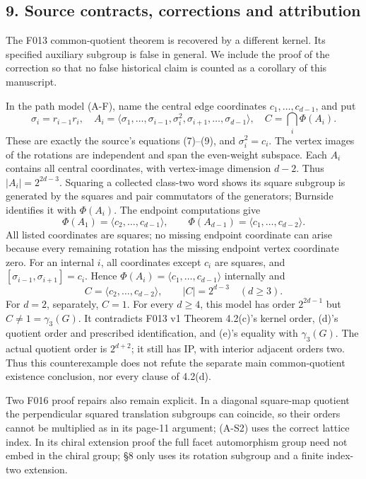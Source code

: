 \documentclass[
  11pt,
  a4paper,
]{article}
\begin{document}
\subsection{9. Source contracts, corrections and
attribution}\label{source-contracts-corrections-and-attribution}

The F013 common-quotient theorem is recovered by a different kernel. Its
specified auxiliary subgroup is false in general. We include the proof
of the correction so that no false historical claim is counted as a
corollary of this manuscript.

In the path model (A-F), name the central edge coordinates
\(c_1,\ldots,c_{d-1}\), and put \[
 \sigma_i=r_{i-1}r_i,\quad
 A_i=\langle\sigma_1,\ldots,\sigma_{i-1},\sigma_i^2,
                  \sigma_{i+1},\ldots,\sigma_{d-1}\rangle,
 \quad C=\bigcap_i\Phi(A_i).                              \tag{A-X1}
\] These are exactly the source's equations (7)--(9), and
\(\sigma_i^2=c_i\). The vertex images of the rotations are independent
and span the even-weight subspace. Each \(A_i\) contains all central
coordinates, with vertex-image dimension \(d-2\). Thus
\(|A_i|=2^{2d-3}\). Squaring a collected class-two word shows its square
subgroup is generated by the squares and pair commutators of the
generators; Burnside identifies it with \(\Phi(A_i)\). The endpoint
computations give \[
 \Phi(A_1)=\langle c_2,\ldots,c_{d-1}\rangle,\qquad
 \Phi(A_{d-1})=\langle c_1,\ldots,c_{d-2}\rangle.
\] All listed coordinates are squares; no missing endpoint coordinate
can arise because every remaining rotation has the missing endpoint
vertex coordinate zero. For an internal \(i\), all coordinates except
\(c_i\) are squares, and \([\sigma_{i-1},\sigma_{i+1}]=c_i\). Hence
\(\Phi(A_i)=\langle c_1,\ldots,c_{d-1}\rangle\) internally and \[
 C=\langle c_2,\ldots,c_{d-2}\rangle,\qquad |C|=2^{d-3}
 \quad(d\ge3).                                          \tag{A-X2}
\] For \(d=2\), separately, \(C=1\). For every \(d\ge4\), this model has
order \(2^{2d-1}\) but \(C\ne1=\gamma_3(G)\). It contradicts F013 v1
Theorem 4.2(c)'s kernel order, (d)'s quotient order and prescribed
identification, and (e)'s equality with \(\gamma_3(G)\). The actual
quotient order is \(2^{d+2}\); it still has IP, with interior adjacent
orders two. Thus this counterexample does not refute the separate main
common-quotient existence conclusion, nor every clause of 4.2(d).

Two F016 proof repairs also remain explicit. In a diagonal square-map
quotient the perpendicular squared translation subgroups can coincide,
so their orders cannot be multiplied as in its page-11 argument; (A-S2)
uses the correct lattice index. In its chiral extension proof the full
facet automorphism group need not embed in the chiral group; §8 only
uses its rotation subgroup and a finite index-two extension.
\end{document}
